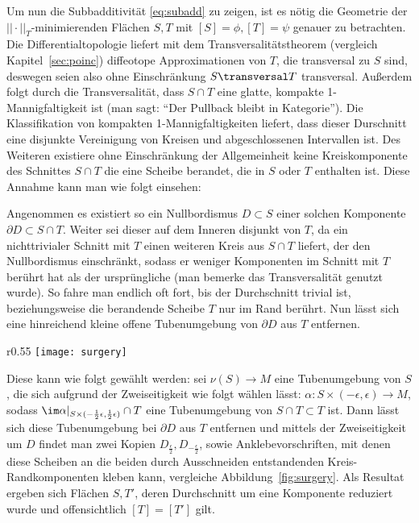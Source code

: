             Um nun die Subbadditivität \eqref{eq:subadd} zu zeigen, ist es nötig die Geometrie der $||\cdot||_T$-minimierenden Flächen $S,T$ mit $[S]=\phi, [T]=\psi$ genauer zu betrachten. Die Differentialtopologie liefert mit dem Transversalitätstheorem (vergleich Kapitel~\ref{sec:poinc}) diffeotope Approximationen von $T$, die transversal zu $S$ sind, deswegen seien also ohne Einschränkung $S \transversal T$ transversal. Außerdem folgt durch die Transversalität, dass $S\cap T$ eine glatte, kompakte 1-Mannigfaltigkeit ist (man sagt: "`Der Pullback bleibt in Kategorie"'). Die Klassifikation von kompakten 1-Mannigfaltigkeiten liefert, dass dieser Durschnitt eine disjunkte Vereinigung von Kreisen und abgeschlossenen Intervallen ist. Des Weiteren existiere ohne Einschränkung der Allgemeinheit keine Kreiskomponente des Schnittes $S\cap T$ die eine Scheibe berandet, die in $S$ oder $T$ enthalten ist. Diese Annahme kann man wie folgt einsehen:

   
            Angenommen es existiert so ein Nullbordismus $D\subset S$ einer solchen Komponente $\partial D \subset S \cap T$. Weiter sei dieser auf dem Inneren disjunkt von $T$, da ein nichttrivialer Schnitt mit $T$ einen weiteren Kreis aus $S\cap T$ liefert, der den Nullbordismus einschränkt, sodass er weniger Komponenten im Schnitt mit $T$ berührt hat als der ursprüngliche (man bemerke das Transversalität genutzt wurde). So fahre man endlich oft fort, bis der Durchschnitt trivial ist, beziehungsweise die berandende Scheibe $T$ nur im Rand berührt.
            Nun lässt sich eine hinreichend kleine offene Tubenumgebung von $\partial D$ aus $T$ entfernen.
                     \begin{wrapfigure}{r}{0.55\textwidth}
                \centering
                \texttt{[image: surgery]}
                \caption{Ausschneiden einer Umgebung von $S\cap T$ und Ankleben zweier Scheiben, sodass die Homologieklasse erhalten bleibt}
                \label{fig:surgery}
            \end{wrapfigure} Diese kann wie folgt gewählt werden: sei $\nu(S) \to M$ eine Tubenumgebung von $S$, die sich aufgrund der Zweiseitigkeit wie folgt wählen lässt: $\alpha: S \times (-\epsilon,\epsilon) \to M$, sodass $\im\alpha|_{S\times (-\frac 12\epsilon,\frac 12 \epsilon)} \cap T$ eine Tubenumgebung von $S\cap T \subset T$ ist. Dann lässt sich diese Tubenumgebung bei $\partial D$ aus $T$ entfernen und mittels der Zweiseitigkeit um $D$ findet man zwei Kopien $D_{\frac \epsilon 2}, D_{-\frac \epsilon 2}$, sowie Anklebevorschriften, mit denen diese Scheiben an die beiden durch Ausschneiden entstandenden Kreis-Randkomponenten kleben kann, vergleiche Abbildung~\ref{fig:surgery}. Als Resultat ergeben sich Flächen $S,T'$, deren Durchschnitt um eine Komponente reduziert wurde und offensichtlich $[T]=[T']$ gilt.%

